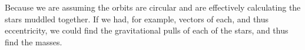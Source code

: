 \documentclass{article}
\begin{document}
\subsubsection{}
    \begin{center}
        Because we are assuming the orbits are circular and are effectively calculating the stars muddled together. If we had, for example, vectors of each, and thus eccentricity, we could find the gravitational pulls of each of the stars, and thus find the masses.
    \end{center}
\subsection{}
\subsubsection{}
\end{document}
